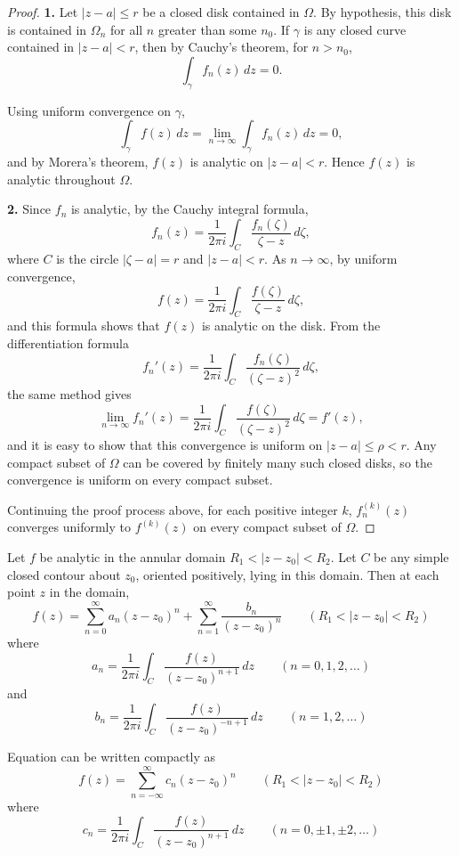 \documentclass{article}
\begin{document}
\begin{proof}
\textbf{1.} Let $|z-a|\le r$ be a closed disk contained in $\Omega$. By hypothesis, this disk is contained in $\Omega_n$ for all $n$ greater than some $n_0$. If $\gamma$ is any closed curve contained in $|z-a|<r$, then by Cauchy's theorem, for $n>n_0$,
\[
\int_\gamma f_n(z)\,dz = 0.
\]

Using uniform convergence on $\gamma$,
\[
\int_\gamma f(z)\,dz = \lim_{n\to\infty}\int_\gamma f_n(z)\,dz = 0,
\]
and by Morera's theorem, $f(z)$ is analytic on $|z-a|<r$. Hence $f(z)$ is analytic throughout $\Omega$.

\textbf{2.} Since $f_n$ is analytic, by the Cauchy integral formula,
\[
f_n(z) = \frac{1}{2\pi i}\int_C \frac{f_n(\zeta)}{\zeta - z}\,d\zeta,
\]
where $C$ is the circle $|\zeta-a|=r$ and $|z-a|<r$. As $n\to\infty$, by uniform convergence,
\[
f(z) = \frac{1}{2\pi i}\int_C \frac{f(\zeta)}{\zeta - z}\,d\zeta,
\]
and this formula shows that $f(z)$ is analytic on the disk. From the differentiation formula
\[
f_n'(z) = \frac{1}{2\pi i}\int_C \frac{f_n(\zeta)}{(\zeta-z)^2}\,d\zeta,
\]
the same method gives
\[
\lim_{n\to\infty} f_n'(z) = \frac{1}{2\pi i}\int_C \frac{f(\zeta)}{(\zeta-z)^2}\,d\zeta = f'(z),
\]
and it is easy to show that this convergence is uniform on $|z-a|\le \rho < r$. Any compact subset of $\Omega$ can be covered by finitely many such closed disks, so the convergence is uniform on every compact subset.

Continuing the proof process above, for each positive integer $k$, $f_n^{(k)}(z)$ converges uniformly to $f^{(k)}(z)$ on every compact subset of $\Omega$.
\end{proof}

\begin{theorem}[Laurent]
Let $f$ be analytic in the annular domain $R_1<|z-z_0|<R_2$. Let $C$ be any simple closed contour about $z_0$, oriented positively, lying in this domain. Then at each point $z$ in the domain,
\[
f(z)=\sum_{n=0}^{\infty}a_n(z-z_0)^n+\sum_{n=1}^{\infty}\frac{b_n}{(z-z_0)^n}
\qquad (R_1<|z-z_0|<R_2) 
\]
where
\[
a_n=\frac{1}{2\pi i}\int_C \frac{f(z)}{(z-z_0)^{n+1}}\,dz \qquad (n=0,1,2,\dots) 
\]
and
\[
b_n=\frac{1}{2\pi i}\int_C \frac{f(z)}{(z-z_0)^{-n+1}}\,dz \qquad (n=1,2,\dots) 
\]
\end{theorem}

Equation can be written compactly as
\[
f(z)=\sum_{n=-\infty}^{\infty}c_n(z-z_0)^n \qquad (R_1<|z-z_0|<R_2) 
\]
where
\[
c_n=\frac{1}{2\pi i}\int_C \frac{f(z)}{(z-z_0)^{n+1}}\,dz \qquad (n=0,\pm1,\pm2,\dots) 
\]
\end{document}
